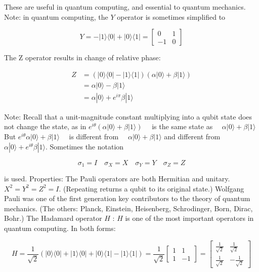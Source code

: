 \documentclass[main.tex]{subfiles}
\begin{document}
    These are useful in quantum computing, and essential to quantum mechanics. Note: in quantum computing, the $Y$ operator is sometimes simplified to
    
    $$
    Y=-|1\rangle\langle 0|+| 0\rangle\langle 1|=\left[\begin{array}{cc}
    0 & 1 \\
    -1 & 0
    \end{array}\right]
    $$
    
    The $\mathrm{Z}$ operator results in change of relative phase:
    
    $$
    \begin{aligned}
    Z &=(|0\rangle\langle 0|-| 1\rangle\langle 1|)(\alpha|0\rangle+\beta|1\rangle) \\
    &=\alpha|0\rangle-\beta|1\rangle \\
    &=\alpha|0\rangle+e^{i \pi} \beta|1\rangle
    \end{aligned}
    $$
    
    Note: Recall that a unit-magnitude constant multiplying into a qubit state does not change the state, as in $e^{i \theta}(\alpha|0\rangle+\beta|1\rangle) \quad$ is the same state as $\quad \alpha|0\rangle+\beta|1\rangle$ But
    $e^{i \theta} \alpha|0\rangle+\beta|1\rangle \quad$ is different from $\quad \alpha|0\rangle+\beta|1\rangle$ and different from $\alpha|0\rangle+e^{i \theta} \beta|1\rangle$. Sometimes the notation
    
    $$
    \sigma_{1}=I \quad \sigma_{X}=X \quad \sigma_{Y}=Y \quad \sigma_{Z}=Z
    $$
    
    is used. Properties: The Pauli operators are both Hermitian and unitary. $X^{2}=Y^{2}=Z^{2}=I$. (Repeating returns a qubit to its original state.) Wolfgang Pauli was one of the first generation key contributors to the theory of quantum mechanics. (The others: Planck, Einstein, Heisenberg, Schrodinger, Born, Dirac, Bohr.) The Hadamard operator $H$ : $H$ is one of the most important operators in quantum computing. In both forms:
    
    $$
    H=\frac{1}{\sqrt{2}}(|0\rangle\langle 0|+| 1\rangle\langle 0|+| 0\rangle\langle 1|-| 1\rangle\langle 1|)=\frac{1}{\sqrt{2}}\left[\begin{array}{cc}
    1 & 1 \\
    1 & -1
    \end{array}\right]=\left[\begin{array}{cc}
    \frac{1}{\sqrt{2}} & \frac{1}{\sqrt{2}} \\
    \frac{1}{\sqrt{2}} & -\frac{1}{\sqrt{2}}
    \end{array}\right]
    $$
    
\end{document}
